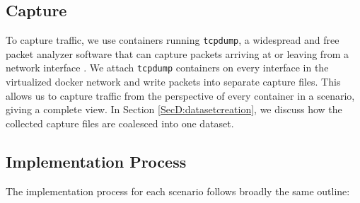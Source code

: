 \subsection{Capture}


To capture traffic, we use containers running \texttt{tcpdump}, a widespread and free packet analyzer software that can capture packets arriving at or leaving from a network interface \cite{jacobson1989tcpdump}.
We attach \texttt{tcpdump} containers on every interface in the virtualized docker network and write packets into separate capture files. This allows us to capture traffic from the perspective of every container in a scenario, giving a complete view. %
In Section \ref{SecD:datasetcreation}, we discuss how the collected capture files are coalesced into one dataset.


\subsection{Implementation Process}

The implementation process for each scenario follows broadly the same outline: 

